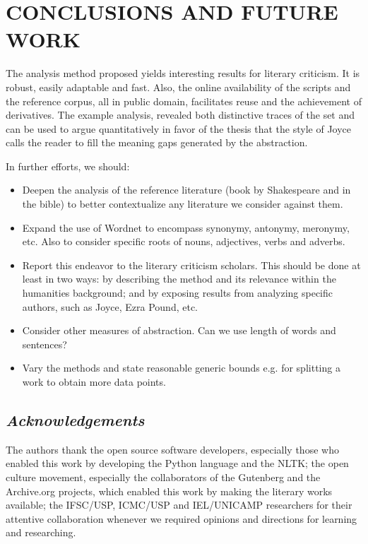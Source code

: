 \documentclass[12pt,fleqn]{article}
\begin{document}
\section{CONCLUSIONS AND FUTURE WORK}\label{sec:conc}
The analysis method proposed yields interesting results for literary criticism.
It is robust, easily adaptable and fast.
Also, the online availability of the scripts and the reference corpus,
all in public domain, facilitates reuse and the achievement of derivatives.
The example analysis,
revealed both distinctive traces of the set and can be used to argue quantitatively
in favor of the thesis that the style of Joyce calls the reader to fill the
meaning gaps generated by the abstraction.

In further efforts, we should:
\begin{itemize}
    \item Deepen the analysis of the reference literature (book by Shakespeare and in the bible)
        to better contextualize any literature we consider against them.
    \item Expand the use of Wordnet to encompass synonymy, antonymy, meronymy, etc.
        Also to consider specific roots of nouns, adjectives, verbs and adverbs.
    \item Report this endeavor to the literary criticism scholars.
        This should be done at least in two ways: by describing the method and its relevance
        within the humanities background;
        and by exposing results from analyzing specific authors, such as Joyce, Ezra Pound, etc.
    \item Consider other measures of abstraction.
        Can we use length of words and sentences?
    \item Vary the methods and state reasonable generic bounds e.g. for splitting a work to
        obtain more data points.
\end{itemize}

\subsection*{\textit{Acknowledgements}}
The authors thank the open source software developers,
especially those who enabled this work by developing
the Python language and the NLTK;
the open culture movement, especially the collaborators
of the Gutenberg and the Archive.org projects, which
enabled this work by making the literary works available;
the IFSC/USP, ICMC/USP and IEL/UNICAMP researchers for their attentive
collaboration whenever we required opinions and directions for learning and researching.
\end{document}
